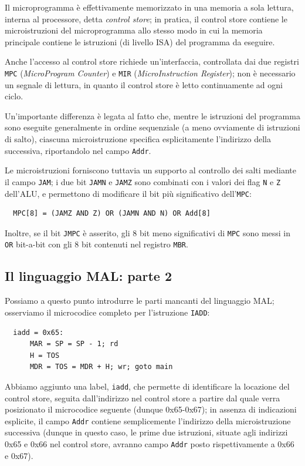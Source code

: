 \documentclass[a4paper,12pt]{scrreprt}
\begin{document}
Il microprogramma è effettivamente memorizzato in una memoria a sola lettura,
interna al processore, detta \textit{control store}; in pratica, il control
store contiene le microistruzioni del microprogramma allo stesso modo in cui la
memoria principale contiene le istruzioni (di livello ISA) del programma da
eseguire.

Anche l'accesso al control store richiede un'interfaccia, controllata dai due
registri \lstinline{MPC} (\textit{MicroProgram Counter}) e \lstinline{MIR}
(\textit{MicroInstruction Register}); non è necessario un segnale di lettura, in
quanto il control store è letto continuamente ad ogni ciclo.

Un'importante differenza è legata al fatto che, mentre le istruzioni del
programma sono eseguite generalmente in ordine sequenziale (a meno ovviamente di
istruzioni di salto), ciascuna microistruzione specifica esplicitamente
l'indirizzo della successiva, riportandolo nel campo \lstinline{Addr}.

Le microistruzioni forniscono tuttavia un supporto al controllo dei salti
mediante il campo \lstinline{JAM}; i due bit \lstinline{JAMN} e \lstinline{JAMZ}
sono combinati con i valori dei flag \lstinline{N} e \lstinline{Z} dell'ALU, e
permettono di modificare il bit più significativo dell'\lstinline{MPC}:

\begin{lstlisting}
  MPC[8] = (JAMZ AND Z) OR (JAMN AND N) OR Add[8]
\end{lstlisting}

Inoltre, se il bit \lstinline{JMPC} è asserito, gli 8 bit meno significativi di
\lstinline{MPC} sono messi in \lstinline{OR} bit-a-bit con gli 8 bit contenuti
nel registro \lstinline{MBR}.

\subsection{Il linguaggio MAL: parte 2}

Possiamo a questo punto introdurre le parti mancanti del linguaggio MAL;
osserviamo il microcodice completo per l'istruzione \lstinline{IADD}:

\begin{lstlisting}
  iadd = 0x65:
      MAR = SP = SP - 1; rd
      H = TOS
      MDR = TOS = MDR + H; wr; goto main
\end{lstlisting}

Abbiamo aggiunto una label, \lstinline{iadd}, che permette di identificare la
locazione del control store, seguita dall'indirizzo nel control store a partire
dal quale verra posizionato il microcodice seguente (dunque 0x65-0x67); in
assenza di indicazioni esplicite, il campo \lstinline{Addr} contiene
semplicemente l'indirizzo della microistruzione successiva (dunque in questo
caso, le prime due istruzioni, situate agli indirizzi 0x65 e 0x66 nel control
store, avranno campo \lstinline{Addr} posto rispettivamente a 0x66 e 0x67).
\end{document}
